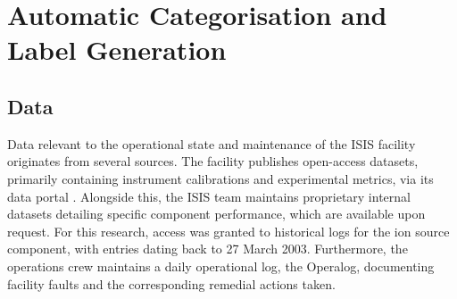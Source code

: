 \documentclass[10pt,oneside]{report}
\begin{document}

\chapter{Automatic Categorisation and Label Generation}\label{chap:Methodology}

\section{Data}

Data relevant to the operational state and maintenance of the ISIS facility originates from several sources. The facility publishes open-access datasets, primarily containing instrument calibrations and experimental metrics, via its data portal \citep{isisdata}. Alongside this, the ISIS team maintains proprietary internal datasets detailing specific component performance, which are available upon request. For this research, access was granted to historical logs for the ion source component, with entries dating back to 27 March 2003. Furthermore, the operations crew maintains a daily operational log, the Operalog, documenting facility faults and the corresponding remedial actions taken.
\end{document}
